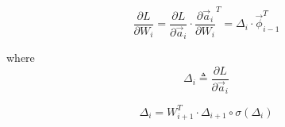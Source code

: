 \documentclass{article}
\begin{document}
\begin{equation}
 \frac{\partial L}{\partial W_i} = \frac{\partial L}{\partial \overrightarrow{a}_{i}} \cdot\frac{\partial \overrightarrow{a}_{i}}{\partial W_i}^T =
 \Delta_i \cdot \overrightarrow{\phi}_{i-1}^T
\end{equation}

where
\begin{equation}
\Delta_i  \triangleq  \frac{\partial L}{\partial \overrightarrow{a}_{i}} 
\end{equation}

\begin{equation}
 \Delta_i = W_{i+1}^T \cdot \Delta_{i+1} \circ \sigma(\Delta_i)
\end{equation}




\newpage
\nocite{*}		 %
{}

\end{document}
